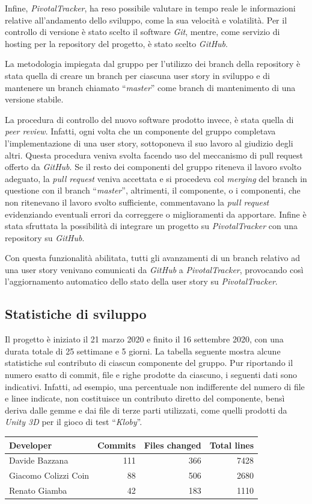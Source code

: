 Infine, \textit{PivotalTracker}, ha reso possibile valutare in tempo
reale le informazioni relative all'andamento dello sviluppo, come la
sua velocità e volatilità.
\newline
\newline
Per il controllo di versione è stato scelto il software \textit{Git},
mentre, come servizio di hosting per la repository del progetto, è
stato scelto \textit{GitHub}.

La metodologia impiegata dal gruppo per l'utilizzo dei branch della
repository è stata quella di creare un branch per ciascuna user story
in sviluppo e di mantenere un branch chiamato ``\textit{master}'' come
branch di mantenimento di una versione stabile.

La procedura di controllo del nuovo software prodotto invece, è stata
quella di \textit{peer review}. Infatti, ogni volta che un componente
del gruppo completava l'implementazione di una user story, sottoponeva
il suo lavoro al giudizio degli altri. Questa procedura veniva svolta
facendo uso del meccanismo di pull request offerto da
\textit{GitHub}. Se il resto dei componenti del gruppo riteneva il
lavoro svolto adeguato, la \textit{pull request} veniva accettata e si
procedeva col \textit{merging} del branch in questione con il branch
``\textit{master}'', altrimenti, il componente, o i componenti, che
non ritenevano il lavoro svolto sufficiente, commentavano la
\textit{pull request} evidenziando eventuali errori da correggere o
miglioramenti da apportare.
\newline
\newline
Infine è stata sfruttata la possibilità di integrare un progetto su
\textit{PivotalTracker} con una repository su \textit{GitHub}.

Con questa funzionalità abilitata, tutti gli avanzamenti di un branch
relativo ad una user story venivano comunicati da \textit{GitHub} a
\textit{PivotalTracker}, provocando così l'aggiornamento automatico
dello stato della user story su \textit{PivotalTracker}.

\subsection{Statistiche di sviluppo}

Il progetto è iniziato il 21 marzo 2020 e finito il 16 settembre
2020, con una durata totale di 25 settimane e 5 giorni.
\newline
\newline
La tabella seguente mostra alcune statistiche sul contributo di
ciascun componente del gruppo. Pur riportando il numero esatto di
commit, file e righe prodotte da ciascuno, i seguenti dati sono
indicativi. Infatti, ad esempio, una percentuale non indifferente del
numero di file e linee indicate, non costituisce un contributo diretto
del componente, bensì deriva dalle gemme e dai file di terze parti
utilizzati, come quelli prodotti da \textit{Unity 3D} per il
gioco di test ``\textit{Kloby}''.

\vspace{1cm}
\begin{tabular}{l|r|r|r}
  \textbf{Developer} & \textbf{Commits} & \textbf{Files changed} & \textbf{Total lines} \\
  \hline
  Davide Bazzana & 111 & 366 & 7428 \\
  \hline
  Giacomo Colizzi Coin & 88 & 506 & 2680 \\
  \hline
  Renato Giamba & 42 & 183 & 1110 \\
  \hline
\end{tabular}
